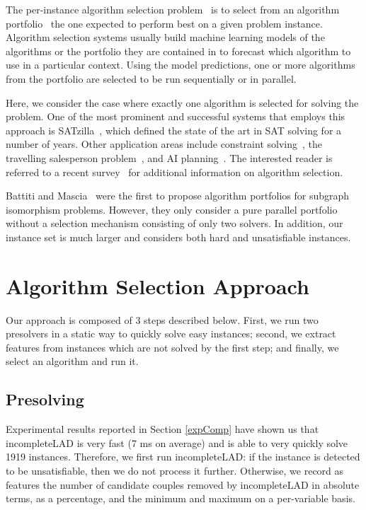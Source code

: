 \documentclass{llncs}
\begin{document}
The per-instance algorithm selection problem~\cite{rice_algorithm_1976} is to select from an
algorithm portfolio~\cite{huberman_economics_1997,gomes_algorithm_2001} the one expected to perform
best on a given problem instance. Algorithm selection systems usually build machine learning models
of the algorithms or the portfolio they are contained in to forecast which algorithm to use in a
particular context. Using the model predictions, one or more algorithms from the portfolio are
selected to be run sequentially or in parallel.

Here, we consider the case where exactly one algorithm is selected for solving the problem. One of
the most prominent and successful systems that employs this approach is
SATzilla~\cite{xu_satzilla_2008}, which defined the state of the art in SAT solving for a number of
years. Other application areas include constraint solving~\cite{omahony_using_2008}, the travelling
salesperson problem~\cite{kotthoff_improving_2015}, and AI planning~\cite{seipp_learning_2012}.
The interested reader is referred to a recent survey~\cite{kotthoff_algorithm_2014} for additional
information on algorithm selection.

\medskip

Battiti and Mascia~\cite{battiti-mascia07} were the first to propose
algorithm portfolios for subgraph isomorphism problems. However, they only
consider a pure parallel portfolio without a selection mechanism consisting of
only two solvers. In addition, our instance set is much larger and considers
both hard and unsatisfiable instances.

\section{Algorithm Selection Approach}

Our approach is composed of 3 steps described below. First, we run two presolvers in a static way to
quickly solve easy instances; second, we extract features from instances which are not solved by the
first step; and finally, we select an algorithm and run it.

\subsection{Presolving}

Experimental results reported in Section \ref{expComp} have shown us that incompleteLAD is very fast
(7 ms on average) and is able to very quickly solve 1919 instances. Therefore, we first run
incompleteLAD: if the instance is detected to be unsatisfiable, then we do not process it further.
Otherwise, we record as features the number of candidate couples removed by incompleteLAD in absolute
terms, as a percentage, and the minimum and maximum on a per-variable basis.
\end{document}
